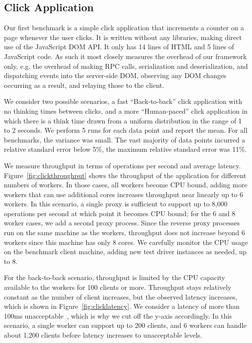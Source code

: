 \subsection{Click Application}
Our first benchmark is a simple click application that increments a counter on a page
whenever the user clicks.  It is written without any libraries, making direct use of
the JavaScript DOM API.  It only has 14 lines of HTML and 5 lines of JavaScript code.
As such it most closely measures the overhead of our
framework only, e.g. the overhead of making RPC calls, serialization and deserialization,
and dispatching events into the server-side DOM, observing any DOM changes occurring as
a result, and relaying those to the client.

We consider two possible scenarios, a fast ``Back-to-back'' click application 
with no thinking times between clicks, and a more ``Human-paced'' click application
in which there is a think time drawn from a uniform distribution in the range of
1 to 2 seconds.  We perform 5 runs for each data point and report the mean.
For all benchmarks, the variance was small. The vast majority of data points incurred
a relative standard error below 5\%, the maximum relative standard error was 11\%.

\clickthroughput{}
\clicklatency{}

We measure throughput in terms of operations per second and average latency.  
Figure~\ref{fig:clickthroughput} shows the throughput of the application for different
numbers of workers. In those cases, all workers become CPU bound, adding more workers
that can use additional cores increases throughput near linearly up to 6 workers. 
In this scenario, a single proxy is sufficient to support up to
8,000 operations per second at which point it becomes CPU bound;
for the 6 and 8 worker cases, we add a second proxy process.
Since the reverse proxy processes run on the same machine as the workers, throughput 
does not increase beyond 6 workers since this machine has only 8 cores.
We carefully monitor the CPU usage on the benchmark client machine, adding new
test driver instances as needed, up to 8.

\clickwaitthroughput{}
\clickwaitlatency{}

For the back-to-back scenario, throughput is limited by the CPU capacity available
to the workers for 100 clients or more.  Throughput stays relatively constant as
the number of client increases, but the observed latency increases, which is
shown in Figure~\ref{fig:clicklatency}.  We consider a latency of more than
100ms unacceptable~\cite{Nielsen1993Usability}, which is why we cut off the y-axis
accordingly.  In this scenario, a single worker can support up to 200 clients,
and 6 workers can handle about 1,200 clients before latency increases to unacceptable
levels. 

